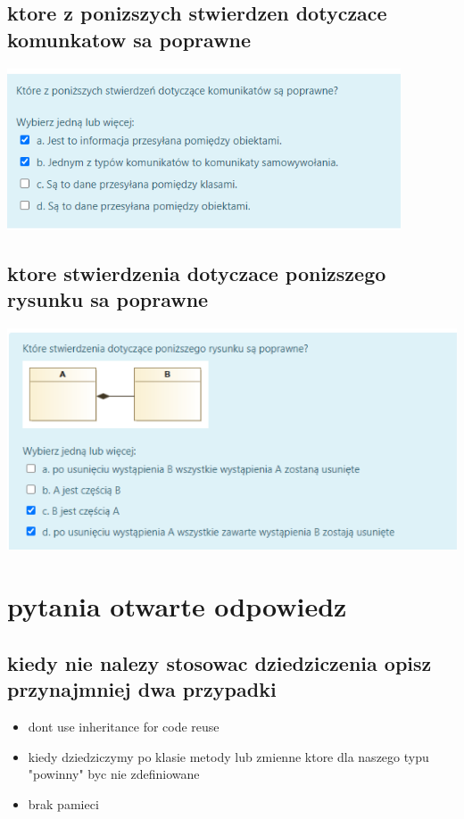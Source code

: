 \documentclass[11pt]{article}
\begin{document}
\subsection{ktore z ponizszych stwierdzen dotyczace komunkatow sa poprawne}
\label{sec:orgcb0fa35}
\begin{center}
\includegraphics[width=.9\linewidth]{./zadanie15.png}
\end{center}
\subsection{ktore stwierdzenia dotyczace ponizszego rysunku sa poprawne}
\label{sec:orgb899610}
\begin{center}
\includegraphics[width=.9\linewidth]{./zadanie16.png}
\end{center}
\section{pytania otwarte odpowiedz}
\label{sec:orgb31f6a3}
\subsection{kiedy nie nalezy stosowac dziedziczenia opisz przynajmniej dwa przypadki}
\label{sec:orga9a79f0}
\begin{itemize}
\item dont use inheritance for code reuse
\item kiedy dziedziczymy po klasie metody lub zmienne ktore dla naszego typu "powinny" byc nie zdefiniowane
\item brak pamieci
\end{itemize}
\end{document}
